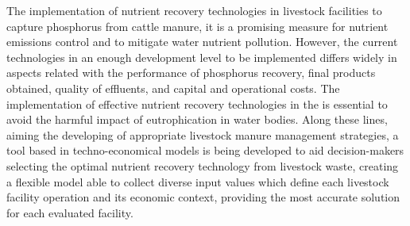 \documentclass[10pt,a4paper]{article}
\begin{document}
The implementation of nutrient recovery technologies in livestock facilities to capture phosphorus from cattle manure, it is a promising measure for nutrient emissions control and to mitigate water nutrient 
pollution. However, the current technologies in an enough development level to be implemented differs widely in aspects related with the performance of phosphorus recovery, final products obtained, quality of effluents, and capital and operational costs.
The implementation of effective nutrient recovery technologies in the is essential to avoid the harmful impact of eutrophication in water bodies. Along these lines, aiming the developing of appropriate livestock manure management strategies, a tool based in techno-economical models is being developed to aid decision-makers selecting the optimal nutrient recovery technology from livestock waste, creating a flexible model able to collect diverse input values which define each livestock facility operation and its economic context, providing the most accurate solution for each evaluated facility.

\end{document}
